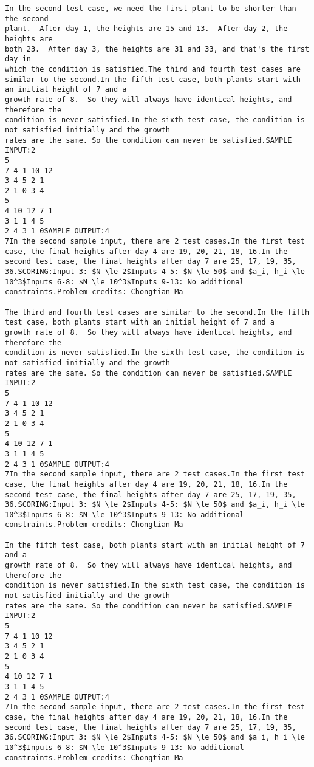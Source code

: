 \documentclass[12pt]{article}
\begin{document}
\begin{verbatim}
In the second test case, we need the first plant to be shorter than the second
plant.  After day 1, the heights are 15 and 13.  After day 2, the heights are
both 23.  After day 3, the heights are 31 and 33, and that's the first day in
which the condition is satisfied.The third and fourth test cases are similar to the second.In the fifth test case, both plants start with an initial height of 7 and a
growth rate of 8.  So they will always have identical heights, and therefore the
condition is never satisfied.In the sixth test case, the condition is not satisfied initially and the growth
rates are the same. So the condition can never be satisfied.SAMPLE INPUT:2
5
7 4 1 10 12
3 4 5 2 1
2 1 0 3 4
5
4 10 12 7 1
3 1 1 4 5
2 4 3 1 0SAMPLE OUTPUT:4
7In the second sample input, there are 2 test cases.In the first test case, the final heights after day 4 are 19, 20, 21, 18, 16.In the second test case, the final heights after day 7 are 25, 17, 19, 35, 36.SCORING:Input 3: $N \le 2$Inputs 4-5: $N \le 50$ and $a_i, h_i \le 10^3$Inputs 6-8: $N \le 10^3$Inputs 9-13: No additional constraints.Problem credits: Chongtian Ma

The third and fourth test cases are similar to the second.In the fifth test case, both plants start with an initial height of 7 and a
growth rate of 8.  So they will always have identical heights, and therefore the
condition is never satisfied.In the sixth test case, the condition is not satisfied initially and the growth
rates are the same. So the condition can never be satisfied.SAMPLE INPUT:2
5
7 4 1 10 12
3 4 5 2 1
2 1 0 3 4
5
4 10 12 7 1
3 1 1 4 5
2 4 3 1 0SAMPLE OUTPUT:4
7In the second sample input, there are 2 test cases.In the first test case, the final heights after day 4 are 19, 20, 21, 18, 16.In the second test case, the final heights after day 7 are 25, 17, 19, 35, 36.SCORING:Input 3: $N \le 2$Inputs 4-5: $N \le 50$ and $a_i, h_i \le 10^3$Inputs 6-8: $N \le 10^3$Inputs 9-13: No additional constraints.Problem credits: Chongtian Ma

In the fifth test case, both plants start with an initial height of 7 and a
growth rate of 8.  So they will always have identical heights, and therefore the
condition is never satisfied.In the sixth test case, the condition is not satisfied initially and the growth
rates are the same. So the condition can never be satisfied.SAMPLE INPUT:2
5
7 4 1 10 12
3 4 5 2 1
2 1 0 3 4
5
4 10 12 7 1
3 1 1 4 5
2 4 3 1 0SAMPLE OUTPUT:4
7In the second sample input, there are 2 test cases.In the first test case, the final heights after day 4 are 19, 20, 21, 18, 16.In the second test case, the final heights after day 7 are 25, 17, 19, 35, 36.SCORING:Input 3: $N \le 2$Inputs 4-5: $N \le 50$ and $a_i, h_i \le 10^3$Inputs 6-8: $N \le 10^3$Inputs 9-13: No additional constraints.Problem credits: Chongtian Ma


\end{verbatim}
\end{document}
